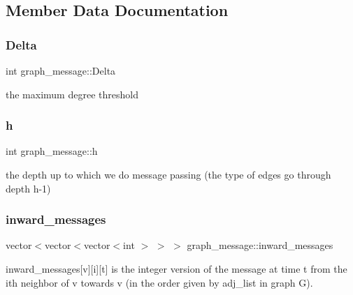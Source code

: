 \subsection{Member Data Documentation}
\mbox{\label{classgraph__message_a45dfd061b7bc73572e5132fbf66efd55}} 
\subsubsection{\texorpdfstring{Delta}{Delta}}
{\footnotesize\ttfamily int graph\+\_\+message\+::\+Delta\hspace{0.3cm}{\ttfamily [private]}}



the maximum degree threshold 

\mbox{\label{classgraph__message_a934d63ed7275c211e13c6fb68824ed46}} 
\subsubsection{\texorpdfstring{h}{h}}
{\footnotesize\ttfamily int graph\+\_\+message\+::h\hspace{0.3cm}{\ttfamily [private]}}



the depth up to which we do message passing (the type of edges go through depth h-\/1) 

\mbox{\label{classgraph__message_ab34dae49ed64132f2b1bbf626c509cd1}} 
\subsubsection{\texorpdfstring{inward\+\_\+messages}{inward\_messages}}
{\footnotesize\ttfamily vector$<$vector$<$vector$<$int $>$ $>$ $>$ graph\+\_\+message\+::inward\+\_\+messages}



inward\+\_\+messages\mbox{[}v\mbox{]}\mbox{[}i\mbox{]}\mbox{[}t\mbox{]} is the integer version of the message at time t from the ith neighbor of v towards v (in the order given by adj\+\_\+list in graph G). 

